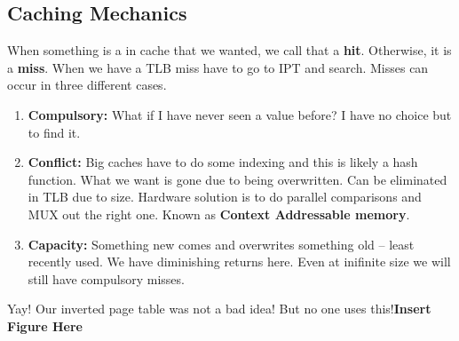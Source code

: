 \documentclass[../base_file/cs1550_notes.tex]{subfiles}
\begin{document}
\subsection{Caching Mechanics}
When something is a in cache that we wanted, we call that a \textbf{hit}.  Otherwise, it is a \textbf{miss}.  When we have a
TLB miss have to go to IPT and search.  Misses can occur in three different cases.
\begin{enumerate}
	\item \textbf{Compulsory:} What if I have never seen a value before?  I have no choice but to find it.
	\item \textbf{Conflict:} Big caches have to do some indexing and this is likely a hash function.  What we want is gone
								due to being overwritten.  Can be eliminated in TLB due to size.  Hardware solution is to
								do parallel comparisons and MUX out the right one.  Known as \textbf{Context Addressable
								memory}.
	\item \textbf{Capacity:} Something new comes and overwrites something old -- least recently used.  We have diminishing
								returns here.  Even at inifinite size we will still have compulsory misses.  
\end{enumerate}
Yay! Our inverted page table was not a bad idea! But no one uses this!\textbf{Insert Figure Here}
\end{document}
